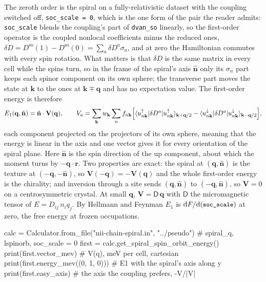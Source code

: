 \documentclass[11pt,a4paper]{article}
\newcommand{\code}[1]{\texttt{\small #1}}
\begin{document}
The zeroth order is the spiral on a fully-relativistic dataset with the coupling
switched off, \code{soc\_scale = 0}, which is the one form of the pair the
reader admits: \code{soc\_scale} blends the coupling's part of
\code{dvan\_so} linearly, so the first-order operator is the coupled nonlocal
coefficients minus the reduced ones,
$\delta D = D^{\mathrm{so}}(1) - D^{\mathrm{so}}(0) = \sum_a \delta D^a\sigma_a$,
and at zero the Hamiltonian commutes with every spin rotation. What matters is
that $\delta D$ is the same matrix in every cell while the spins turn, so in the
frame of the spiral's axis $\hat{\mathbf n}$ only its $\sigma_n$ part keeps each
spinor component on its own sphere; the transverse part moves the state at
$\mathbf k$ to the ones at $\mathbf k \mp \mathbf q$ and has no expectation
value. The first-order energy is therefore
\begin{equation*}
E_1(\mathbf q, \hat{\mathbf n}) = \hat{\mathbf n}\cdot\mathbf V(\mathbf q),\qquad
V_a = \sum_{\mathbf k} w_{\mathbf k} \sum_n f_{n\mathbf k}\Bigl[
  \langle u^{\uparrow}_{n\mathbf k}|\delta D^a|u^{\uparrow}_{n\mathbf k}\rangle_{\mathbf k + \mathbf q/2}
 - \langle u^{\downarrow}_{n\mathbf k}|\delta D^a|u^{\downarrow}_{n\mathbf k}\rangle_{\mathbf k - \mathbf q/2}\Bigr],
\end{equation*}
each component projected on the projectors of its own sphere, meaning that the
energy is linear in the axis and one vector gives it for every orientation of
the spiral plane. Here $\hat{\mathbf n}$ is the spin direction of the up
component, about which the moment turns by $-\mathbf q\cdot\mathbf r$. Two
properties are exact: the spiral at $(\mathbf q, \hat{\mathbf n})$ is the
texture at $(-\mathbf q, -\hat{\mathbf n})$, so $\mathbf V(-\mathbf q) =
-\mathbf V(\mathbf q)$ and the whole first-order energy is the chirality; and
inversion through a site sends $(\mathbf q, \hat{\mathbf n})$ to
$(-\mathbf q, \hat{\mathbf n})$, so $\mathbf V = 0$ on a centrosymmetric
crystal. At small $\mathbf q$, $\mathbf V = \mathsf D\,\mathbf q$ with
$\mathsf D$ the micromagnetic tensor of $E = D_{ij}\,n_i q_j$. By Hellmann and
Feynman $E_1$ is $\mathrm dF/\mathrm d(\text{\code{soc\_scale}})$ at zero, the
free energy at frozen occupations.

\begin{pycode}
calc = Calculator.from_file("nii-chain-spiral.in", "../pseudo")  # spiral_q, lspinorb, soc_scale = 0
first = calc.get_spiral_spin_orbit_energy()
print(first.vector_mev)            # V(q), meV per cell, cartesian
print(first.energy_mev((0, 1, 0))) # E1 with the spiral's axis along y
print(first.easy_axis)             # the axis the coupling prefers, -V/|V|
\end{pycode}
\end{document}
